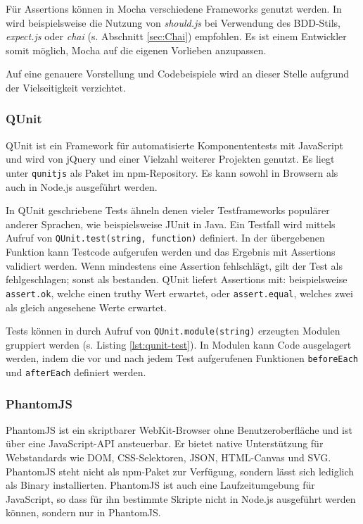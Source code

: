 Für Assertions können in Mocha verschiedene Frameworks genutzt werden. In \cite{mocha-index} wird beispielsweise die Nutzung von \textit{should.js} bei Verwendung des BDD-Stils, \textit{expect.js} oder \textit{chai} (s. Abschnitt \ref{sec:Chai}) empfohlen. Es ist einem Entwickler somit möglich, Mocha auf die eigenen Vorlieben anzupassen.\cite{mocha-index}

Auf eine genauere Vorstellung und Codebeispiele wird an dieser Stelle aufgrund der Vielseitigkeit verzichtet.

\subsubsection{QUnit}
\label{sec:QUnit}
QUnit ist ein Framework für automatisierte Komponententests mit JavaScript und wird von jQuery und einer Vielzahl weiterer Projekten genutzt. Es liegt unter \texttt{qunitjs} als Paket im npm-Repository. Es kann sowohl in Browsern als auch in Node.js ausgeführt werden.\cite{qunit-index}

In QUnit geschriebene Tests ähneln denen vieler Testframeworks populärer anderer Sprachen, wie beispielsweise JUnit in Java. Ein Testfall wird mittels Aufruf von \texttt{QUnit.test(string, function)} definiert. In der übergebenen Funktion kann Testcode aufgerufen werden und das Ergebnis mit Assertions validiert werden. Wenn mindestens eine Assertion fehlschlägt, gilt der Test als fehlgeschlagen; sonst als bestanden. QUnit liefert Assertions mit: beispielsweise \texttt{assert.ok}, welche einen truthy Wert erwartet, oder \texttt{assert.equal}, welches zwei als gleich angesehene Werte erwartet.\cite{qunit-cookbook}

Tests können in durch Aufruf von \texttt{QUnit.module(string)} erzeugten Modulen gruppiert werden (s. Listing \ref{lst:qunit-test}). In Modulen kann Code ausgelagert werden, indem die vor und nach jedem Test aufgerufenen Funktionen \texttt{beforeEach} und \texttt{afterEach} definiert werden.\cite{qunit-cookbook}

\begin{figure}[H]
	
\end{figure}

\subsubsection{PhantomJS}
\label{sec:PhantomJS}
PhantomJS ist ein skriptbarer WebKit-Browser ohne Benutzeroberfläche und ist über eine JavaScript-API ansteuerbar. Er bietet native Unterstützung für Webstandards wie DOM, CSS-Selektoren, JSON, HTML-Canvas und SVG.\cite{phantomjs-index} PhantomJS steht nicht als npm-Paket zur Verfügung, sondern lässt sich lediglich als Binary installierten\cite{phantomjs-faq}. PhantomJS ist auch eine Laufzeitumgebung für JavaScript, so dass für ihn bestimmte Skripte nicht in Node.js ausgeführt werden können, sondern nur in PhantomJS\cite{phantomjs-quickstart}.

